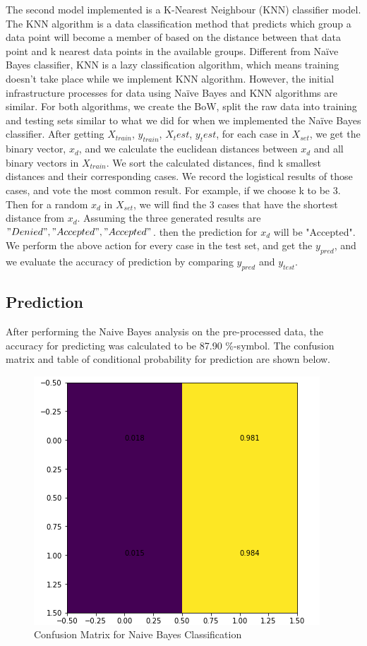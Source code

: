 \documentclass[conference]{IEEEtran}
\begin{document}
The second model implemented is a K-Nearest Neighbour (KNN) classifier model. The KNN algorithm is a data classification method that predicts which group a data point will become a member of based on the distance between that data point and k nearest data points in the available groups. Different from Naïve Bayes classifier, KNN is a lazy classification algorithm, which means training doesn't take place while we implement KNN algorithm. However, the initial infrastructure processes for data using Naïve Bayes and KNN algorithms are similar. For both algorithms, we create the BoW, split the raw data into training and testing sets similar to what we did for when we implemented the Naïve Bayes classifier. After getting \(X_{train}\), \(y_{train}\), \({X}_test\), \({y}_test\), for each case in \(X_{set}\), we get the binary vector, \(x_d\), and we calculate the euclidean distances between \(x_d\) and all binary vectors in \(X_{train}\). We sort the calculated distances, find k smallest distances and their corresponding cases. We record the logistical results of those cases, and vote the most common result. For example, if we choose k to be 3. Then for a random \(x_d\) in \(X_{set}\), we will find the 3 cases that have the shortest distance from \(x_d\). Assuming the three generated results are \({"Denied", "Accepted", "Accepted"}\). then the prediction for \(x_d\) will be "Accepted". We perform the above action for every case in the test set, and get the \(y_{pred}\), and we evaluate the accuracy of prediction by comparing \(y_{pred}\) and \(y_{test}\). 


\subsection{Prediction}

After performing the Naive Bayes analysis on the pre-processed data, the accuracy for predicting was calculated to be 87.90 \%-symbol. The confusion matrix and table of conditional probability for prediction are shown below. 

\begin{figure}[htbp]
\centerline{\hbox{\hspace{1em}\includegraphics[scale = 0.5]{confus_naive.png}}}
\caption{Confusion Matrix for Naive Bayes Classification}
\label{fig_con_n}
\end{figure}
\end{document}
